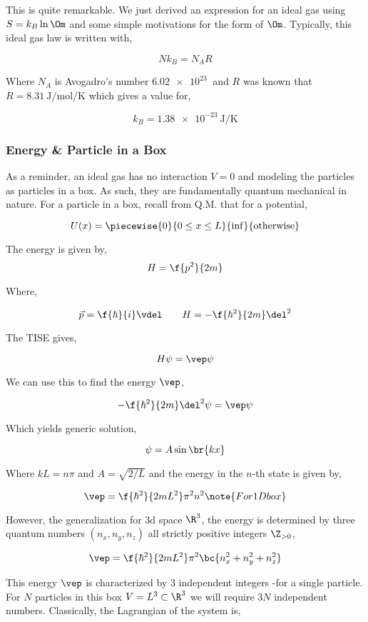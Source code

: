 \documentclass{article}
\begin{document}
This is quite remarkable. We just derived an expression for an ideal gas using $S = k_B\ln\Om$ and some simple motivations for the form of $\Om$. Typically, this ideal gas law is written with,

\[ N k_B = N_A R \]

Where $N_A$ is Avogadro's number $\SI{6.02e23}{}$ and $R$ was known that $R = \SI{8.31}{\J\per\mole\per\K}$ which gives a value for,

\[ k_B = \SI{1.38e-23}{\J\per\K} \]

\subsubsection{Energy \& Particle in a Box}

As a reminder, an ideal gas has no interaction $V=0$ and modeling the particles as particles in a box. As such, they are fundamentally quantum mechanical in nature. For a particle in a box, recall from Q.M. that for a potential,

\[ U(x) = \piecewise{0}{0 \leq x \leq L}{\inf}{\text{otherwise}} \]

The energy is given by,
\[ H = \f{p^2}{2m} \]

Where,

\[ \vec{p} = \f{\hbar}{i} \vdel \qquad H = -\f{\hbar^2}{2m}\del^2\]

The TISE gives,

\[ H \psi = \vep \psi \]

We can use this to find the energy $\vep$,

\[ -\f{\hbar^2}{2m}\del^2 \psi = \vep \psi \]

Which yields generic solution,

\[ \psi = A \sin \br{kx} \]

Where $k L = n \pi$ and $A = \sqrt{2/L}$ and the energy in the $n$-th state is given by,

\[ \vep = \f{\hbar^2}{2mL^2} \pi^2 n^2 \note{For 1D box}\]

However, the generalization for 3d space $\R^3$, the energy is determined by three quantum numbers $(n_x, n_y, n_z)$ all strictly positive integers $\Z_{>0}$,

\[ \vep = \f{\hbar^2}{2mL^2} \pi^2 \bc{n_x^2 + n_y^2 + n_z^2}\]

This energy $\vep$ is characterized by $3$ independent integers -for a single particle. For $N$ particles in this box $V = L^3 \subset \R^3$ we will require $3N$ independent numbers. Classically, the Lagrangian of the system is,
\end{document}
